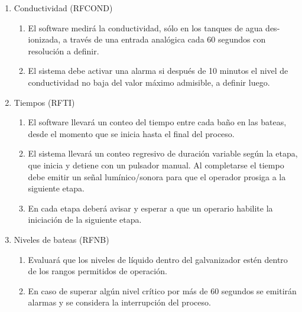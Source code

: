 \begin{enumerate}
\begin{enumerate}
\item Conductividad (RFCOND)
\begin{enumerate}
\item El software medirá la conductividad, sólo en los tanques de agua des-ionizada, a través de una entrada analógica cada 60 segundos con resolución a definir.
\item El sistema debe activar una alarma si después de 10 minutos el nivel de conductividad no baja del valor máximo admisible, a definir luego.
\end{enumerate}

\item Tiempos (RFTI)
\begin{enumerate}
\item El software llevará un conteo del tiempo entre cada baño en las bateas, desde el momento que se inicia hasta el final del proceso.
\item El sistema llevará un conteo regresivo de duración variable según la etapa, que inicia y detiene con un pulsador manual. Al completarse el tiempo debe emitir un señal lumínico/sonora para que el operador prosiga a la siguiente etapa.
\item En cada etapa deberá avisar y esperar a que un operario habilite la iniciación de la siguiente etapa.
\end{enumerate}

\item Niveles de bateas (RFNB)	
\begin{enumerate}
\item Evaluará que los niveles de líquido dentro del galvanizador estén dentro de los rangos permitidos de operación.
\item En caso de superar algún nivel crítico por más de 60 segundos se emitirán alarmas y se considera la interrupción del proceso.
\end{enumerate}


\end{enumerate}
\end{enumerate}
